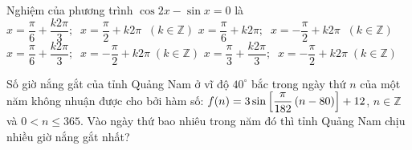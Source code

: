 \begin{ex}%
	Nghiệm của phương trình $\cos2x-\sin x=0$ là
	\haicot
	{$x=\dfrac{\pi}{6}+\dfrac{k2\pi}{3}; \; \; x=\dfrac{\pi}{2}+k2\pi \; \; \left(k\in \mathbb{Z}\right)$}
	{$x=\dfrac{\pi}{6}+k2\pi; \; \; x=-\dfrac{\pi}{2}+k2\pi \; \; \left(k\in \mathbb{Z}\right)$}
	{\True $x=\dfrac{\pi}{6}+\dfrac{k2\pi}{3}; \; \; x=-\dfrac{\pi}{2}+k2\pi \; \left(k\in \mathbb{Z}\right)$}
	{$x=\dfrac{\pi}{3}+\dfrac{k2\pi}{3}; \; \; x=-\dfrac{\pi}{2}+k2\pi \; \left(k\in \mathbb{Z}\right)$}
\end{ex}

\begin{ex}%
	Số giờ nắng gắt của tỉnh Quảng Nam ở vĩ độ $40^\circ$ bắc trong ngày thứ $n$ của một năm không nhuận được cho bởi hàm số: $f(n)=3\sin \left[\dfrac{{\it \pi}}{182} \left(n-80\right)\right]+12$, $n\in \mathbb{Z}$ và $0< n\le 365$. Vào ngày thứ bao nhiêu trong năm đó thì tỉnh Quảng Nam chịu nhiều giờ nắng gắt nhất?
\end{ex}

